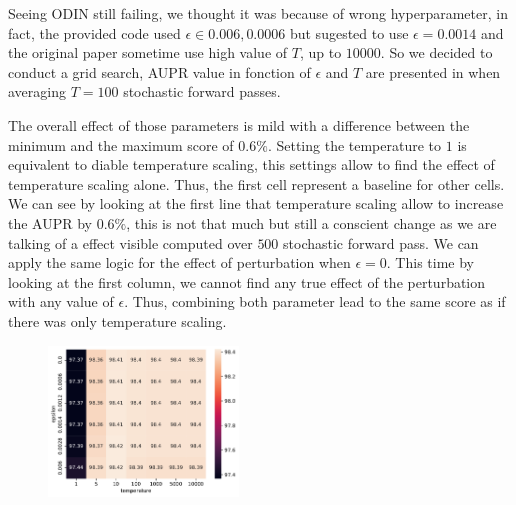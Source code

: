 Seeing ODIN still failing, we thought it was because of wrong hyperparameter, in fact, the provided code used $ \epsilon \in {0.006, 0.0006} $ but sugested to use $ \epsilon = 0.0014 $ and the original paper sometime use high value of $ T $, up to $10000$. So we decided to conduct a grid search, AUPR value in fonction of $ \epsilon  $ and $ T $ are presented in  when averaging $ T=100 $ stochastic forward passes. 

The overall effect of those parameters is mild with a difference between the minimum and the maximum score of $ 0.6\% $. Setting the temperature to $ 1 $ is equivalent to diable temperature scaling, this settings allow to find the effect of temperature scaling alone. Thus, the first cell represent a baseline for other cells. We can see by looking at the first line that temperature scaling allow to increase the AUPR by $ 0.6\% $, this is not that much but still a conscient change as we are talking of a effect visible computed over $ 500 $ stochastic forward pass. We can apply the same logic for the effect of perturbation when $ \epsilon = 0 $. This time by looking at the first column, we cannot find any true effect of the perturbation with any value of $ \epsilon $. Thus, combining both parameter lead to the same score as if there was only temperature scaling.
\begin{figure}[H]
    \centering
    \includegraphics[width=0.45\textwidth]{odin_grid_search.pdf}
    \caption{}
    \label{fig:odin_grid_search}
\end{figure}